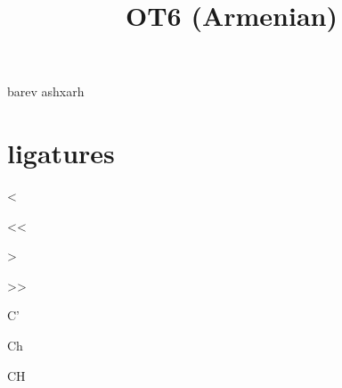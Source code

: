 \documentclass{amsart}
\title{OT6 (Armenian)}
\begin{document}
\maketitle

\selectfont


barev ashxarh

\section{ligatures}

<

<<

>

>>

C'

Ch

CH
\end{document}
